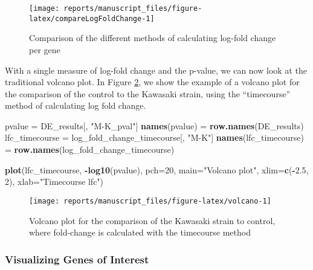 \documentclass[9pt,a4paper,]{extarticle}
\newenvironment{Shaded}{\begin{snugshade}}{\end{snugshade}}
\newcommand{\DataTypeTok}[1]{\textcolor[rgb]{0.13,0.29,0.53}{#1}}
\newcommand{\DecValTok}[1]{\textcolor[rgb]{0.00,0.00,0.81}{#1}}
\newcommand{\FloatTok}[1]{\textcolor[rgb]{0.00,0.00,0.81}{#1}}
\newcommand{\KeywordTok}[1]{\textcolor[rgb]{0.13,0.29,0.53}{\textbf{#1}}}
\newcommand{\NormalTok}[1]{#1}
\newcommand{\OperatorTok}[1]{\textcolor[rgb]{0.81,0.36,0.00}{\textbf{#1}}}
\newcommand{\StringTok}[1]{\textcolor[rgb]{0.31,0.60,0.02}{#1}}
\begin{document}
\begin{figure}[H]

{\centering \texttt{[image: reports/manuscript\_files/figure-latex/compareLogFoldChange-1]} 

}

\caption{Comparison of the different methods of calculating log-fold change per gene}\label{fig:compareLogFoldChange}
\end{figure}

With a single measure of log-fold change and the p-value, we can now look at
the traditional volcano plot. In Figure \ref{fig:volcano}, we show the example
of a volcano plot for the comparison of the control to the Kawasaki strain,
using the ``timecourse'' method of calculating log fold change.

\begin{Shaded}
\begin{Highlighting}[]
\NormalTok{pvalue =}\StringTok{ }\NormalTok{DE_results[, }\StringTok{"M-K_pval"}\NormalTok{]}
\KeywordTok{names}\NormalTok{(pvalue) =}\StringTok{ }\KeywordTok{row.names}\NormalTok{(DE_results)}
\NormalTok{lfc_timecourse =}\StringTok{ }\NormalTok{log_fold_change_timecourse[, }\StringTok{"M-K"}\NormalTok{]}
\KeywordTok{names}\NormalTok{(lfc_timecourse) =}\StringTok{ }\KeywordTok{row.names}\NormalTok{(log_fold_change_timecourse)}

\KeywordTok{plot}\NormalTok{(lfc_timecourse, }\OperatorTok{-}\KeywordTok{log10}\NormalTok{(pvalue), }\DataTypeTok{pch=}\DecValTok{20}\NormalTok{, }\DataTypeTok{main=}\StringTok{"Volcano plot"}\NormalTok{,}
     \DataTypeTok{xlim=}\KeywordTok{c}\NormalTok{(}\OperatorTok{-}\FloatTok{2.5}\NormalTok{, }\DecValTok{2}\NormalTok{), }\DataTypeTok{xlab=}\StringTok{"Timecourse lfc"}\NormalTok{)}
\end{Highlighting}
\end{Shaded}

\begin{figure}[H]

{\centering \texttt{[image: reports/manuscript\_files/figure-latex/volcano-1]} 

}

\caption{Volcano plot for the comparison of the Kawasaki strain to control, where fold-change is calculated with the timecourse method}\label{fig:volcano}
\end{figure}

\hypertarget{visualizing-genes-of-interest}{%
\subsubsection{Visualizing Genes of Interest}\label{visualizing-genes-of-interest}}
\end{document}

